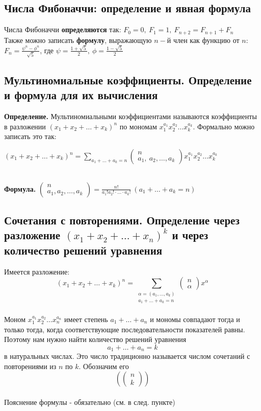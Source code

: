 \documentclass[a4paper]{article}
\begin{document}
\subsection{Числа Фибоначчи: определение и явная формула}
Числа Фибоначчи \textbf{определяются} так: $F_0=0,\ F_1=1,\ F_{n+2}=F_{n+1}+F_n$\\[2mm]
\label{sec:1.38}Также можно записать \textbf{формулу}, выражающую $n-$й член как функцию от $n$: $F_n=\frac{\psi^n-\phi^n}{\sqrt{5}}$, где $\psi=\frac{1+\sqrt{5}}{2},\ \phi=\frac{1-\sqrt{5}}{2}$
\subsection{Мультиномиальные коэффициенты. Определение и формула для их вычисления}
\textbf{Определение.} Мультиномиальными коэффициентами называются коэффициенты в разложении $(x_1+x_2+\ldots+x_k)^n$ по мономам $x_1^{a_1}x_2^{a_2}\ldots x_k^{a_k}$. Формально можно записать это так:\\[2mm]
\centerline{$(x_1+x_2+\ldots+x_k)^n=\sum\limits_{a_1+\ldots+a_k=n} \begin{pmatrix}
    n\\
    a_1,\ a_2,\ldots, a_k
\end{pmatrix}x_1^{a_1}x_2^{a_2}\ldots x_k^{a_k}$}\\[2mm]
\label{sec:1.39}\textbf{Формула.} $\begin{pmatrix}
    n\\
    a_1,a_2,\ldots,a_k
\end{pmatrix}=\frac{n!}{a_1!a_2!\cdot\ldots\cdot a_k!}\ (a_1+\ldots+a_k=n)$
\subsection{Сочетания с повторениями. Определение через разложение $(x_1+x_2+\ldots+x_n)^k$ и через количество решений уравнения}
Имеется разложение: $$
\left(x_{1}+x_{2}+\ldots+x_{k}\right)^{n}=\sum_{\substack{\alpha=\left(a_{1}, \ldots, a_{k}\right) \\
a_{1}+\ldots+a_{k}=n}}\left(\begin{array}{l}
n \\
\alpha
\end{array}\right) x^{\alpha}
$$\\[2mm]
Моном $x_{1}^{a_{1}} x_{2}^{a_{2}} \ldots x_{n}^{a_{n}}$ имеет степень $a_{1}+\ldots+a_{n}$ и мономы совпадают тогда и только тогда, когда соответствующие последовательности показателей равны. Поэтому нам нужно найти количество решений уравнения
$$
a_{1}+\ldots+a_{n}=k
$$
в натуральных числах. Это число традиционно называется числом сочетаний с повторениями из $n$ по $k$. Обозначим его
$$
\left(\left(\begin{array}{l}
n \\
k
\end{array}\right)\right)
$$\\[2mm]
Пояснение формулы - обязательно (см. в след. пункте)
\end{document}
